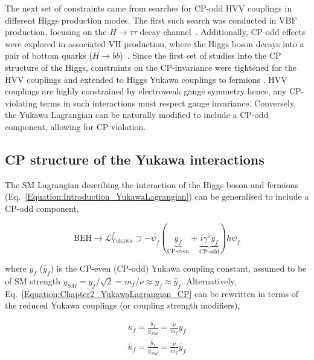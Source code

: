 The next set of constraints came from searches for CP-odd 
HVV couplings in different Higgs production modes. The first such search was conducted in VBF production, focusing on the 
$H\to\tau\tau$ decay channel~\cite{CP_constraints_4}. Additionally, CP-odd effects were explored in associated VH production, where the Higgs boson decays into a pair of bottom quarks ($H\to bb$)~\cite{CP_constraints_5}. Since the first set of studies into the CP structure of the Higgs, constraints on the CP-invariance were tightened for the HVV couplings and extended to Higgs Yukawa couplings to fermions \cite{CP_constraints_6,CP_constraints_7,CP_constraints_8,CP_constraints_9,CP_constraints_10,CP_constraints_11,CP_constraints_12,CP_constraints_13,CP_constraints_14,CP_constraints_15,CP_constraints_16,CP_constraints_17,CP_constraints_18,CP_constraints_19,CP_constraints_20,CP_constraints_21,CP_constraints_22}. HVV couplings are highly constrained by electroweak gauge symmetry hence, any CP-violating terms in such interactions must respect gauge invariance. Conversely, the Yukawa Lagrangian can be naturally modified to include a CP-odd component, allowing for CP violation.

\subsection{CP structure of the Yukawa interactions}

The SM Lagrangian describing the interaction of the Higgs boson and fermions (Eq.~\ref{Equation:Introduction_YukawaLagrangian}) can be generalised to include a CP-odd component,

\begin{equation}
    \text{BEH} \rightarrow \mathcal{L}_{\text{Yukawa}}^f \supset - \overline{\psi_f} (\underbrace{y_f}_{\text{CP-even}} + \underbrace{i\gamma^5\tilde{y}_f}_{\text{CP-odd}})h\psi_f
\label{Equation:Chapter2_YukawaLagrangian_CP}
\end{equation}

where $y_f$ ($\tilde{y_f}$) is the CP-even (CP-odd) Yukawa coupling constant, assumed to be of SM strength \ie $y_{SM} = g_f/\sqrt{2}=m_f/\nu\approx y_f \approx \tilde{y_f}$. Alternatively, Eq.~\ref{Equation:Chapter2_YukawaLagrangian_CP} can be rewritten in terms of the reduced Yukawa couplings (or coupling strength modifiers),

\begin{equation}
\begin{aligned}
    \kappa_f = \frac{y_f}{y_{SM}}=\frac{\nu}{m_f}y_f \\
    \tilde{\kappa_f} = \frac{\tilde{y_f}}{y_{SM}}=\frac{\nu}{m_f}\tilde{y_f} \\
\end{aligned}
\end{equation}

